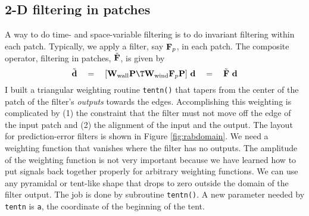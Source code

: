 \subsection{2-D filtering in patches}
A way to do time- and space-variable filtering
is to do invariant filtering within each patch.
Typically, we apply a filter, say $\bold F_p$, in each patch.
The composite operator, filtering in patches,
$\tilde{\bold F}$,
is given by
\begin{equation}
\tilde {\bold d}
\quad = \quad 
[ \bold W_{\rm wall} \bold P\T \bold W_{\rm wind} \bold F_p \bold P ]\  \bold d
\quad = \quad 
\tilde{\bold F}
\ \bold d
\label{eqn:patchfilt}
\end{equation}
I built a triangular weighting routine
\texttt{tentn()}
that tapers from the center of the patch of the filter's {\it outputs}
towards the edges.
Accomplishing this weighting is complicated by
(1) the constraint
that the filter must not move off the edge of the input patch
and
(2) the alignment of the input and the output.
The layout for prediction-error filters is shown
in Figure \ref{fig:rabdomain}.
We need a weighting function that vanishes where the filter
has no outputs.
The amplitude of the weighting function is not very important
because we have learned how to put signals back together
properly for arbitrary weighting functions.
We can use any pyramidal or tent-like shape
that drops to zero outside the domain of the filter output.
The job is done by subroutine {\tt tentn()}.
A new parameter needed by \texttt{tentn}
is \texttt{a}, the coordinate of the beginning of the tent.

